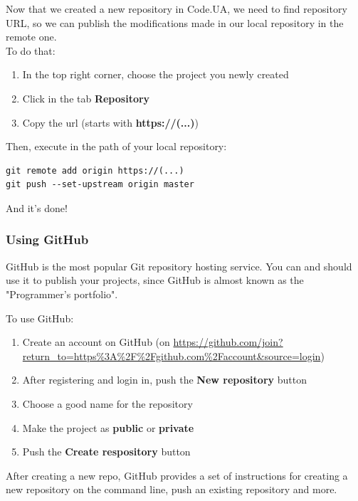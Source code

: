 \documentclass{article}
\begin{document}
Now that we created a new repository in Code.UA, we need to find repository URL, so we can publish the modifications made in our local repository in the\underline{} remote one.\\

To do that:

\begin{enumerate}
\item In the top right corner, choose the project you newly created
\item Click in the tab \textbf{Repository}
\item Copy the url (starts with \textbf{https://(...)\underline{}})
\end{enumerate}

Then, execute in the path of your local repository:

\begin{lstlisting}
git remote add origin https://(...)
git push --set-upstream origin master
\end{lstlisting}

And it's done!

\subsubsection{Using GitHub}

GitHub is the most popular Git repository hosting service. You can and should use it to publish your projects, since GitHub is almost known as the "Programmer's portfolio".

To use GitHub:

\begin{enumerate}
\item Create an account on GitHub (on \url{https://github.com/join?return_to=https%3A%2F%2Fgithub.com%2Faccount&source=login})
\item After registering and login in, push the \textbf{New repository} button
\item Choose a good name for the repository
\item Make the project as \textbf{public} or \textbf{private}
\item Push the \textbf{Create respository} button
\end{enumerate}

After creating a new repo, GitHub provides a set of instructions for creating a new repository on the command line, push an existing repository and more.\\
\end{document}
